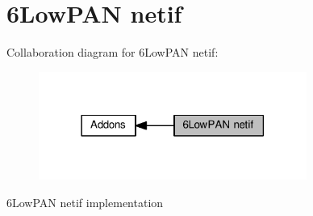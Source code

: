 \hypertarget{group__sixlowpan}{}\section{6\+Low\+P\+AN netif}
\label{group__sixlowpan}
Collaboration diagram for 6\+Low\+P\+AN netif\+:
\nopagebreak
\begin{figure}[H]
\begin{center}
\leavevmode
\includegraphics[width=249pt]{group__sixlowpan}
\end{center}
\end{figure}
6\+Low\+P\+AN netif implementation 